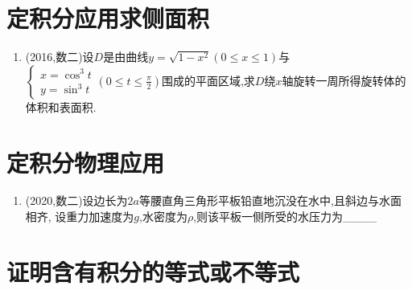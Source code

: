 \documentclass[12pt, a4paper, oneside, UTF8]{ctexbook}
\begin{document}
\section{ 定积分应用求侧面积}

\begin{enumerate}[label=\arabic*.,start=19]
    \item (2016,数二)设$D$是由曲线$y=\sqrt{1-x^2}(0\leq x\leq 1)$与
    $\begin{cases}
        x=\cos^3t \\
        y=\sin^3t 
    \end{cases}(0\leq t\leq \frac{\pi}{2})$围成的平面区域,求$D$绕$x$轴旋转一周所得旋转体的体积和表面积.
    
    \begin{solution}
    \newpage
    \end{solution}
\end{enumerate}

\section{定积分物理应用}

\begin{enumerate}[label=\arabic*.,start=20]
    \item (2020,数二)设边长为$2a$等腰直角三角形平板铅直地沉没在水中,且斜边与水面相齐,
    设重力加速度为$g$,水密度为$\rho$,则该平板一侧所受的水压力为\_\_\_\_
    
    \begin{solution}
    \newpage
    \end{solution}
\end{enumerate}

\section{证明含有积分的等式或不等式}
\end{document}
